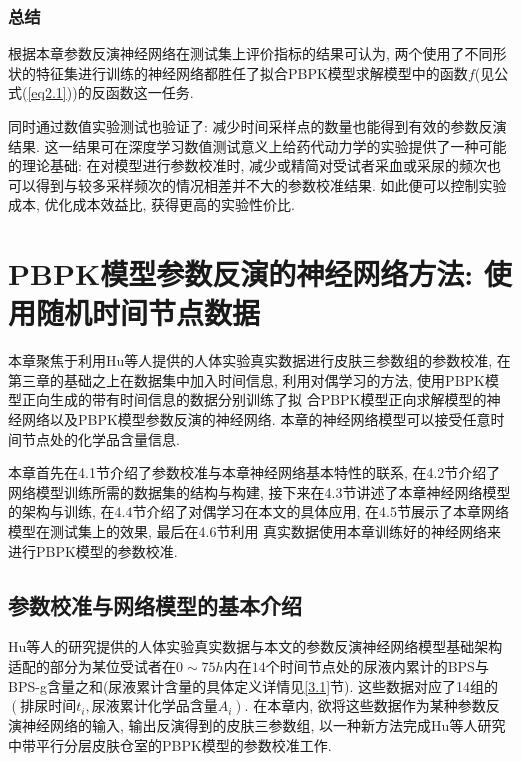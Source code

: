 \documentclass[a4paper,punct=banjiao,twoside]{ctexrep}
\theoremstyle{plain}
\theoremstyle{definition}
\theoremstyle{remark}
\begin{document}
\subsection*{总结}
根据本章参数反演神经网络在测试集上评价指标的结果可认为, 两个使用了不同形状的特征集进行训练的神经网络都胜任了拟合PBPK模型求解模型中的函数$f$(见公式(\ref{eq2.1}))的反函数这一任务.

同时通过数值实验测试也验证了: 减少时间采样点的数量也能得到有效的参数反演结果. 这一结果可在深度学习数值测试意义上给药代动力学的实验提供了一种可能的理论基础: 在对模型进行参数校准时,
减少或精简对受试者采血或采尿的频次也可以得到与较多采样频次的情况相差并不大的参数校准结果. 如此便可以控制实验成本, 优化成本效益比, 获得更高的实验性价比.


\chapter{PBPK模型参数反演的神经网络方法: 使用随机时间节点数据}

本章聚焦于利用Hu等人\cite{11}提供的人体实验真实数据进行皮肤三参数组的参数校准, 在第三章的基础之上在数据集中加入时间信息, 利用对偶学习的方法, 使用PBPK模型正向生成的带有时间信息的数据分别训练了拟
合PBPK模型正向求解模型的神经网络以及PBPK模型参数反演的神经网络. 本章的神经网络模型可以接受任意时间节点处的化学品含量信息. 

本章首先在4.1节介绍了参数校准与本章神经网络基本特性的联系, 在4.2节介绍了网络模型训练所需的数据集的结构与构建, 接下来在4.3节讲述了本章神经网络模型的架构与训练, 
在4.4节介绍了对偶学习在本文的具体应用, 在4.5节展示了本章网络模型在测试集上的效果, 最后在4.6节利用
真实数据使用本章训练好的神经网络来进行PBPK模型的参数校准.

\section{参数校准与网络模型的基本介绍}
\label{4.1}
Hu等人\cite{11}的研究提供的人体实验真实数据与本文的参数反演神经网络模型基础架构适配的部分为某位受试者在$0\sim 75h$内在$14$个时间节点处的尿液内累计的BPS与BPS-g含量之和(尿液累计含量的具体定义详情见\ref{3.1}节).
这些数据对应了14组的$(\textit{排尿时间}t_i, \textit{尿液累计化学品含量}A_i)$. 
在本章内, 欲将这些数据作为某种参数反演神经网络的输入, 输出反演得到的皮肤三参数组, 以一种新方法完成Hu等人\cite{11}研究中带平行分层皮肤仓室的PBPK模型的参数校准工作.
\end{document}
